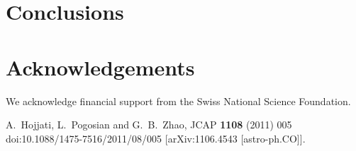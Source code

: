 \documentclass[a4paper,10pt]{article}
\begin{document}
%



\section{Conclusions}

\setcounter{equation}{0}

 
\section*{Acknowledgements}

We acknowledge financial support from the Swiss National Science Foundation.


\appendix
%

%



\begin{thebibliography}{999}
\newcommand{\bb}{\bibitem}
  A.~Hojjati, L.~Pogosian and G.~B.~Zhao,
  JCAP {\bf 1108} (2011) 005
  doi:10.1088/1475-7516/2011/08/005
  [arXiv:1106.4543 [astro-ph.CO]].
 \end{thebibliography}
\end{document}
